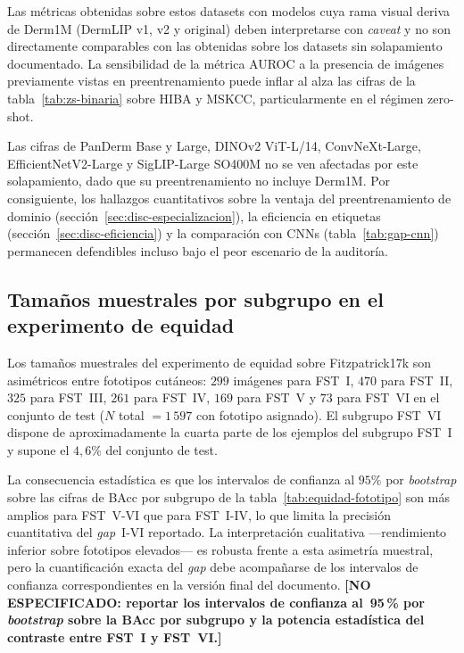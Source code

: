 Las métricas obtenidas sobre estos datasets con modelos cuya rama
visual deriva de Derm1M (DermLIP v1, v2 y original) deben
interpretarse con \emph{caveat} y no son directamente comparables
con las obtenidas sobre los datasets sin solapamiento documentado.
La sensibilidad de la métrica AUROC a la presencia de imágenes
previamente vistas en preentrenamiento puede inflar al alza las
cifras de la tabla~\ref{tab:zs-binaria} sobre HIBA y MSKCC,
particularmente en el régimen zero-shot.

Las cifras de PanDerm Base y Large, DINOv2 ViT-L/14,
ConvNeXt-Large, EfficientNetV2-Large y SigLIP-Large SO400M no se
ven afectadas por este solapamiento, dado que su preentrenamiento
no incluye Derm1M. Por consiguiente, los hallazgos cuantitativos
sobre la ventaja del preentrenamiento de dominio
(secci\'on~\ref{sec:disc-especializacion}), la eficiencia en etiquetas
(secci\'on~\ref{sec:disc-eficiencia}) y la comparación con CNNs
(tabla~\ref{tab:gap-cnn}) permanecen defendibles incluso bajo el
peor escenario de la auditoría.

\subsection{Tamaños muestrales por subgrupo en el experimento de equidad}
\label{sec:lim-muestrales}

Los tamaños muestrales del experimento de equidad sobre
Fitzpatrick17k son asimétricos entre fototipos cutáneos: $299$
imágenes para FST~I, $470$ para FST~II, $325$ para FST~III,
$261$ para FST~IV, $169$ para FST~V y $73$ para FST~VI
en el conjunto de test ($N$ total $=1\,597$ con fototipo
asignado). El subgrupo FST~VI dispone de aproximadamente la cuarta
parte de los ejemplos del subgrupo FST~I y supone el $4{,}6\%$
del conjunto de test.

La consecuencia estadística es que los intervalos de confianza al
$95\%$ por \emph{bootstrap} sobre las cifras de
BAcc por subgrupo de la tabla~\ref{tab:equidad-fototipo} son más
amplios para FST~V-VI que para FST~I-IV, lo que limita la
precisión cuantitativa del \emph{gap}~I-VI reportado. La
interpretación cualitativa ---rendimiento inferior sobre fototipos
elevados--- es robusta frente a esta asimetría muestral, pero la
cuantificación exacta del \emph{gap} debe acompañarse de los
intervalos de confianza correspondientes en la versión final del
documento. \textbf{[NO ESPECIFICADO: reportar los intervalos de
confianza al~95\,\% por \emph{bootstrap} sobre la BAcc por
subgrupo y la potencia estadística del contraste entre FST~I y
FST~VI.]}

